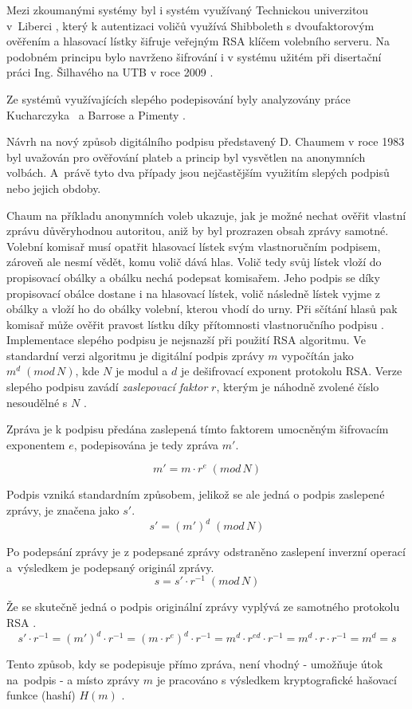 \bigskip

Mezi zkoumanými systémy byl i systém využívaný Technickou univerzitou v~Liberci \cite{Vejvoda2015}, který k autentizaci voličů využívá Shibboleth s dvoufaktorovým ověřením a hlasovací lístky šifruje veřejným RSA klíčem volebního serveru. Na podobném principu bylo navrženo šifrování i v systému užitém při disertační práci Ing. Šilhavého na UTB v roce 2009 \cite{Silhavy2009}.

Ze systémů využívajících slepého podepisování byly analyzovány práce Kucharczyka~\cite{Kucharczyk} a Barrose a Pimenty \cite{receiptFree}.

\bigskip

Návrh na nový způsob digitálního podpisu představený D. Chaumem v roce 1983 byl uvažován pro ověřování plateb a princip byl vysvětlen na anonymních volbách. A~právě tyto dva případy jsou nejčastějším využitím slepých podpisů nebo jejich obdoby. 

Chaum na příkladu anonymních voleb ukazuje, jak je možné nechat ověřit vlastní zprávu důvěryhodnou autoritou, aniž by byl prozrazen obsah zprávy samotné.  Volební komisař musí opatřit hlasovací lístek svým vlastnoručním podpisem, zároveň ale nesmí vědět, komu volič dává hlas. Volič tedy svůj lístek vloží do propisovací obálky a obálku nechá podepsat komisařem. Jeho podpis se díky propisovací obálce dostane i na hlasovací lístek, volič následně lístek vyjme z obálky a vloží ho do obálky volební, kterou vhodí do urny. Při sčítání hlasů pak komisař může ověřit pravost lístku díky přítomnosti vlastnoručního podpisu \cite{chaum}.
\clearpage
{}\label{section:blindSign}
Implementace slepého podpisu je nejsnazší při použití RSA algoritmu. Ve standardní verzi algoritmu je digitální podpis zprávy $m$ vypočítán jako $m^d\;(mod\,N)$, kde $N$ je modul a $d$ je dešifrovací exponent protokolu RSA. Verze slepého podpisu zavádí \textit{zaslepovací faktor} $r$, kterým je náhodně zvolené číslo nesoudělné s $N$ \cite{chaum}.

Zpráva je k podpisu předána zaslepená tímto faktorem umocněným šifrovacím exponentem $e$, podepisována je tedy zpráva $m'$.

\[ m' = m \cdot r^e\;(mod\,N) \]

Podpis vzniká standardním způsobem, jelikož se ale jedná o podpis zaslepené zprávy, je značena jako $s'$.
\[ s' = (m')^d \; (mod\,N) \]

Po podepsání zprávy je z podepsané zprávy odstraněno zaslepení inverzní operací a~výsledkem je podepsaný originál zprávy.
\[ s = s' \cdot r^{-1} \;(mod\,N) \]

Že se skutečně jedná o podpis originální zprávy vyplývá ze samotného protokolu RSA \cite{rsa}.
\[ s' \cdot r^{-1} = (m')^d \cdot r^{-1} = (m \cdot r^e)^d \cdot r^{-1} = 
	m^d \cdot r^{ed} \cdot r^{-1} = m^d \cdot r \cdot r^{-1} = m^d = s
\]

Tento způsob, kdy se podepisuje přímo zpráva, není vhodný - umožňuje útok na~podpis - a místo zprávy $m$ je pracováno s výsledkem kryptografické hašovací funkce (hashí) $H(m)$ \cite{RsaAdventures}.